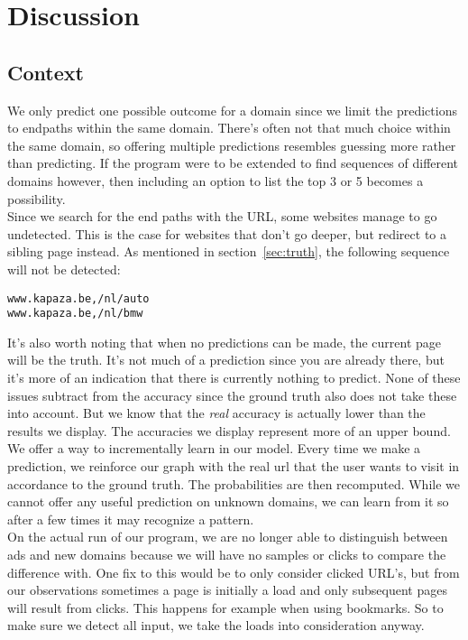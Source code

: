 \section{Discussion}\label{sec:discussion}

\subsection{Context}

We only predict one possible outcome for a domain since we limit the predictions to endpaths within the same domain. There's often not that much choice within the same domain, so offering multiple predictions resembles guessing more rather than predicting. If the program were to be extended to find sequences of different domains however, then including an option to list the top 3 or 5 becomes a possibility.
\\[2ex]
Since we search for the end paths with the URL, some websites manage to go undetected. This is the case for websites that don't go deeper, but redirect to a sibling page instead. As mentioned in section~\ref{sec:truth}, the following sequence will not be detected:
\begin{verbatim}
www.kapaza.be,/nl/auto
www.kapaza.be,/nl/bmw
\end{verbatim}
It's also worth noting that when no predictions can be made, the current page will be the truth. It's not much of a prediction since you are already there, but it's more of an indication that there is currently nothing to predict. None of these issues subtract from the accuracy since the ground truth also does not take these into account. But we know that the \textit{real} accuracy is actually lower than the results we display. The accuracies we display represent more of an upper bound.
\\[2ex]
We offer a way to incrementally learn in our model. Every time we make a prediction, we reinforce our graph with the real url that the user wants to visit in accordance to the ground truth. The probabilities are then recomputed. While we cannot offer any useful prediction on unknown domains, we can learn from it so after a few times it may recognize a pattern. 
\\[2ex]
On the actual run of our program, we are no longer able to distinguish between ads and new domains because we will have no samples or clicks to compare the difference with. One fix to this would be to only consider clicked URL's, but from our observations sometimes a page is initially a load and only subsequent pages will result from clicks. This happens for example when using bookmarks. So to make sure we detect all input, we take the loads into consideration anyway.

